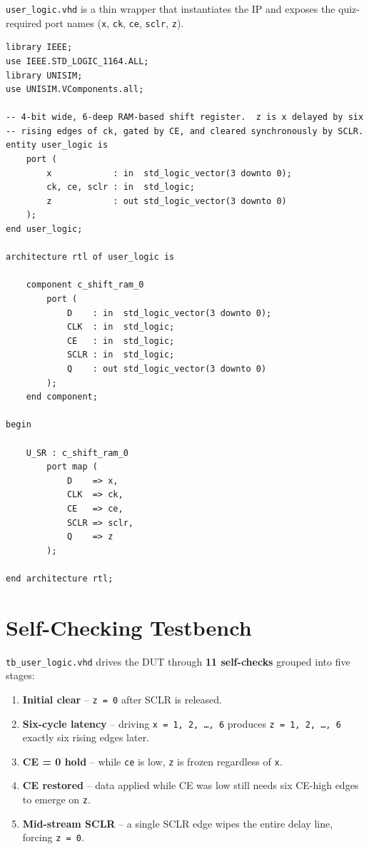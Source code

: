 \documentclass[11pt,letterpaper]{article}
\begin{document}
\texttt{user\_logic.vhd} is a thin wrapper that instantiates the IP and
exposes the quiz-required port names (\texttt{x}, \texttt{ck}, \texttt{ce},
\texttt{sclr}, \texttt{z}).

\begin{lstlisting}[caption={user\_logic.vhd},label={lst:userlogic}]
library IEEE;
use IEEE.STD_LOGIC_1164.ALL;
library UNISIM;
use UNISIM.VComponents.all;

-- 4-bit wide, 6-deep RAM-based shift register.  z is x delayed by six
-- rising edges of ck, gated by CE, and cleared synchronously by SCLR.
entity user_logic is
    port (
        x            : in  std_logic_vector(3 downto 0);
        ck, ce, sclr : in  std_logic;
        z            : out std_logic_vector(3 downto 0)
    );
end user_logic;

architecture rtl of user_logic is

    component c_shift_ram_0
        port (
            D    : in  std_logic_vector(3 downto 0);
            CLK  : in  std_logic;
            CE   : in  std_logic;
            SCLR : in  std_logic;
            Q    : out std_logic_vector(3 downto 0)
        );
    end component;

begin

    U_SR : c_shift_ram_0
        port map (
            D    => x,
            CLK  => ck,
            CE   => ce,
            SCLR => sclr,
            Q    => z
        );

end architecture rtl;
\end{lstlisting}

\section{Self-Checking Testbench}

\texttt{tb\_user\_logic.vhd} drives the DUT through \textbf{11 self-checks}
grouped into five stages:

\begin{enumerate}
    \item \textbf{Initial clear} -- \texttt{z = 0} after SCLR is released.
    \item \textbf{Six-cycle latency} -- driving \texttt{x = 1, 2, \dots, 6}
          produces \texttt{z = 1, 2, \dots, 6} exactly six rising edges later.
    \item \textbf{CE = 0 hold} -- while \texttt{ce} is low, \texttt{z} is
          frozen regardless of \texttt{x}.
    \item \textbf{CE restored} -- data applied while CE was low still needs
          six CE-high edges to emerge on \texttt{z}.
    \item \textbf{Mid-stream SCLR} -- a single SCLR edge wipes the entire
          delay line, forcing \texttt{z = 0}.
\end{enumerate}
\end{document}
